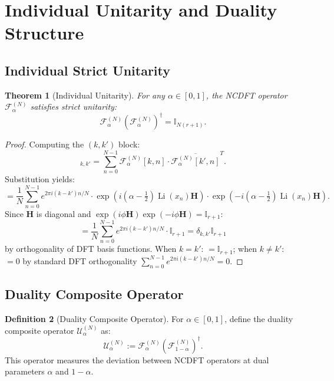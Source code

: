 \documentclass[12pt,a4paper]{amsart}
\theoremstyle{plain}
\newtheorem{theorem}{Theorem}[section]
\theoremstyle{definition}
\newtheorem{definition}[theorem]{Definition}
\theoremstyle{remark}
\DeclareMathOperator{\Li}{Li}
\begin{document}
\section{Individual Unitarity and Duality Structure}

\subsection{Individual Strict Unitarity}

\begin{theorem}[Individual Unitarity]\label{thm:unitarity}
For any $\alpha \in [0,1]$, the NCDFT operator $\mathcal{F}_\alpha^{(N)}$ satisfies strict unitarity:
\begin{equation}
\mathcal{F}_\alpha^{(N)} (\mathcal{F}_\alpha^{(N)})^\dagger = \mathbb{I}_{N(r+1)}.
\end{equation}
\end{theorem}

\begin{proof}
Computing the $(k,k')$ block:
\begin{equation}
[\mathcal{F}_\alpha^{(N)} (\mathcal{F}_\alpha^{(N)})^\dagger]_{k,k'} = \sum_{n=0}^{N-1} \mathcal{F}_\alpha^{(N)}[k,n] \cdot \overline{\mathcal{F}_\alpha^{(N)}[k',n]}^T.
\end{equation}
Substitution yields:
\begin{equation}
= \frac{1}{N} \sum_{n=0}^{N-1} e^{2\pi i (k-k')n/N} \cdot \exp\left(i(\alpha-\tfrac{1}{2})\Li(x_n)\mathbf{H}\right) \cdot \exp\left(-i(\alpha-\tfrac{1}{2})\Li(x_n)\mathbf{H}\right).
\end{equation}
Since $\mathbf{H}$ is diagonal and $\exp(i\phi \mathbf{H})\exp(-i\phi \mathbf{H}) = \mathbb{I}_{r+1}$:
\begin{equation}
= \frac{1}{N} \sum_{n=0}^{N-1} e^{2\pi i (k-k')n/N} \cdot \mathbb{I}_{r+1} = \delta_{k,k'} \mathbb{I}_{r+1}
\end{equation}
by orthogonality of DFT basis functions. When $k=k'$: $= \mathbb{I}_{r+1}$; when $k \neq k'$: $=0$ by standard DFT orthogonality $\sum_{n=0}^{N-1} e^{2\pi i (k-k')n/N} = 0$.
\end{proof}

\subsection{Duality Composite Operator}

\begin{definition}[Duality Composite Operator]\label{def:duality}
For $\alpha \in [0,1]$, define the duality composite operator $\mathcal{U}_\alpha^{(N)}$ as:
\begin{equation}
\mathcal{U}_\alpha^{(N)} := \mathcal{F}_\alpha^{(N)} (\mathcal{F}_{1-\alpha}^{(N)})^\dagger.
\end{equation}
This operator measures the deviation between NCDFT operators at dual parameters $\alpha$ and $1-\alpha$.
\end{definition}
\end{document}
